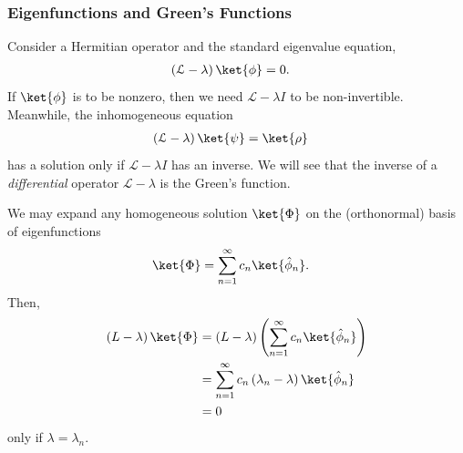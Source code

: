 \documentclass[10pt]{mypackage}
\begin{document}
  \subsubsection{Eigenfunctions and Green's Functions}%
  Consider a Hermitian operator and the standard eigenvalue equation,
  \begin{align*}
    \left( \mathcal{L}-\lambda \right)\ket{\phi} &= 0.
  \end{align*}
  If $\ket{\phi}$ is to be nonzero, then we need $\mathcal{L}-\lambda I$ to be non-invertible. Meanwhile, the inhomogeneous equation
  \begin{align*}
    \left( \mathcal{L}-\lambda \right)\ket{\psi} &= \ket{\rho}
  \end{align*}
  has a solution only if $\mathcal{L}-\lambda I$ has an inverse. We will see that the inverse of a \textit{differential} operator $\mathcal{L}-\lambda$ is the Green's function.\newline

  We may expand any homogeneous solution $\ket{\Phi}$ on the (orthonormal) basis of eigenfunctions
  \begin{align*}
    \ket{\Phi} &= \sum_{n=1}^{\infty} c_n\ket{\hat{\phi}_n}.
  \end{align*}
  Then,
  \begin{align*}
    \left( L-\lambda \right) \ket{\Phi} &= \left( L - \lambda \right)\left( \sum_{n=1}^{\infty}c_n\ket{\hat{\phi}_n} \right)\\
                                        &= \sum_{n=1}^{\infty} c_n\left( \lambda_n - \lambda \right)\ket{\hat{\phi}_n}\\
                                        &= 0
  \end{align*}
  only if $\lambda = \lambda_n$.\newline
\end{document}
